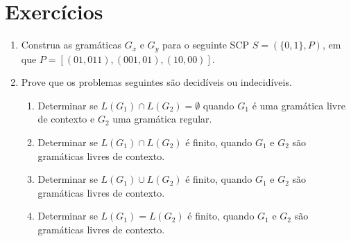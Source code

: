 \documentclass[a4paper]{article}
\theoremstyle{definition}
\begin{document}
    \section*{Exercícios}

    \begin{enumerate}
      \item Construa as gramáticas $G_x$ e $G_y$ para o seguinte SCP $S =
        (\{0,1\}, P)$, em que $P = [(01,011), (001,01), (10,00)]$.
      \item Prove que os problemas seguintes são decidíveis ou indecidíveis.
        \begin{enumerate}
          \item Determinar se $L(G_1) \cap L(G_2) = \emptyset$ quando $G_1$ é
            uma gramática livre de contexto e $G_2$ uma gramática regular.
          \item Determinar se $L(G_1) \cap L(G_2)$ é finito, quando $G_1$ e
            $G_2$ são gramáticas livres de contexto.
          \item Determinar se $L(G_1) \cup L(G_2)$ é finito, quando $G_1$ e
            $G_2$ são gramáticas livres de contexto.
          \item Determinar se $L(G_1) = L(G_2)$ é finito, quando $G_1$ e
            $G_2$ são gramáticas livres de contexto.
        \end{enumerate}
    \end{enumerate}
\end{document}
